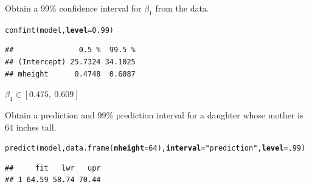 \documentclass[12pt,oneside,a4paper]{article}\usepackage[]{graphicx}\usepackage[]{xcolor}
\makeatletter
\newcommand{\hlnum}[1]{\textcolor[rgb]{0,0,0}{#1}}%
\newcommand{\hlstr}[1]{\textcolor[rgb]{0,0,1}{#1}}%
\newcommand{\hlstd}[1]{\textcolor[rgb]{0,0,0}{#1}}%
\newcommand{\hlkwc}[1]{\textcolor[rgb]{0.498,0,0.333}{\textbf{#1}}}%
\newcommand{\hlkwd}[1]{\textcolor[rgb]{0,0,0}{#1}}%
\newenvironment{kframe}{%
 \def\at@end@of@kframe{}%
 \ifinner\ifhmode%
  \def\at@end@of@kframe{\end{minipage}}%
  \begin{minipage}{\columnwidth}%
 \fi\fi%
 \def\FrameCommand##1{\hskip\@totalleftmargin \hskip-\fboxsep
 \colorbox{shadecolor}{##1}\hskip-\fboxsep
     \hskip-\linewidth \hskip-\@totalleftmargin \hskip\columnwidth}%
 \MakeFramed {\advance\hsize-\width
   \@totalleftmargin\z@ \linewidth\hsize
   \@setminipage}}%
 {\par\unskip\endMakeFramed%
 \at@end@of@kframe}
\newenvironment{knitrout}{}{} %
\newenvironment{problem}[2][Problem]{\begin{trivlist}
\item[\hskip \labelsep {\bfseries #1}\hskip \labelsep {\bfseries #2.}]}{\end{trivlist}}
\makeatother
\begin{document}
\begin{problem}{2.13.2}
Obtain a 99\% confidence interval for $\beta_{1}$ from the data.
\end{problem}

\begin{knitrout}
\color{fgcolor}\begin{kframe}
\begin{alltt}
\hlkwd{confint}\hlstd{(model,} \hlkwc{level}\hlstd{=}\hlnum{0.99}\hlstd{)}
\end{alltt}
\begin{verbatim}
##               0.5 %  99.5 %
## (Intercept) 25.7324 34.1025
## mheight      0.4748  0.6087
\end{verbatim}
\end{kframe}
\end{knitrout}

$\beta_{1} \in [0.475, ~0.609]$

\begin{problem}{2.13.3}
Obtain a prediction and 99\% prediction interval for a daughter
whose mother is 64 inches tall.
\end{problem}
\begin{knitrout}
\color{fgcolor}\begin{kframe}
\begin{alltt}
\hlkwd{predict}\hlstd{(model,} \hlkwd{data.frame}\hlstd{(}\hlkwc{mheight}\hlstd{=}\hlnum{64}\hlstd{),} \hlkwc{interval}\hlstd{=}\hlstr{"prediction"}\hlstd{,} \hlkwc{level}\hlstd{=}\hlnum{.99}\hlstd{)}
\end{alltt}
\begin{verbatim}
##     fit   lwr   upr
## 1 64.59 58.74 70.44
\end{verbatim}
\end{kframe}
\end{knitrout}
\end{document}
